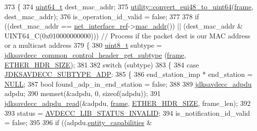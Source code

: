 \begin{DoxyCode}
373 \{
374     \hyperlink{parse_8c_aec6fcb673ff035718c238c8c9d544c47}{uint64\_t} dest\_mac\_addr;
375     \hyperlink{namespaceavdecc__lib_1_1utility_a93805682670fa173878eaecac28efc2c}{utility::convert\_eui48\_to\_uint64}(\hyperlink{gst__avb__playbin_8c_ac8e710e0b5e994c0545d75d69868c6f0}{frame}, dest\_mac\_addr);
376     is\_operation\_id\_valid = \textcolor{keyword}{false};
377 
378     \textcolor{keywordflow}{if} ((dest\_mac\_addr == \hyperlink{namespaceavdecc__lib_adb4da03bc65b7846cc240ee919bbde19}{net\_interface\_ref}->\hyperlink{classavdecc__lib_1_1net__interface__imp_a742e975c065f9067f42182847df080da}{mac\_addr}()) || (dest\_mac\_addr & 
      UINT64\_C(0x010000000000))) \textcolor{comment}{// Process if the packet dest is our MAC address or a multicast address}
379     \{
380         \hyperlink{stdint_8h_aba7bc1797add20fe3efdf37ced1182c5}{uint8\_t} subtype = \hyperlink{group__jdksavdecc__avtp__common__control__header_ga42ef04eef2565c32449a0593033de47b}{jdksavdecc\_common\_control\_header\_get\_subtype}
      (\hyperlink{gst__avb__playbin_8c_ac8e710e0b5e994c0545d75d69868c6f0}{frame}, \hyperlink{namespaceavdecc__lib_a6c827b1a0d973e18119c5e3da518e65ca9512ad9b34302ba7048d88197e0a2dc0}{ETHER\_HDR\_SIZE});
381 
382         \textcolor{keywordflow}{switch} (subtype)
383         \{
384         \textcolor{keywordflow}{case} \hyperlink{group__subtype_gad332b6f1f3f41f705c04917256c26761}{JDKSAVDECC\_SUBTYPE\_ADP}:
385         \{
386             end\_station\_imp * end\_station = \hyperlink{openavb__types__base__pub_8h_a070d2ce7b6bb7e5c05602aa8c308d0c4}{NULL};
387             \textcolor{keywordtype}{bool} found\_adp\_in\_end\_station = \textcolor{keyword}{false};
388 
389             \hyperlink{structjdksavdecc__adpdu}{jdksavdecc\_adpdu} adpdu;
390             memset(&adpdu, 0, \textcolor{keyword}{sizeof}(adpdu));
391             \hyperlink{group__adpdu_ga0b7b4807db97c9d3deaeed3b8b11adc1}{jdksavdecc\_adpdu\_read}(&adpdu, \hyperlink{gst__avb__playbin_8c_ac8e710e0b5e994c0545d75d69868c6f0}{frame}, 
      \hyperlink{namespaceavdecc__lib_a6c827b1a0d973e18119c5e3da518e65ca9512ad9b34302ba7048d88197e0a2dc0}{ETHER\_HDR\_SIZE}, frame\_len);
392 
393             status = \hyperlink{namespaceavdecc__lib_affd436edb2cecd20cfd784a84f852b2ba8a4a3486ee32871689aae7049d91ac0c}{AVDECC\_LIB\_STATUS\_INVALID};
394             is\_notification\_id\_valid = \textcolor{keyword}{false};
395 
396             \textcolor{keywordflow}{if} ((adpdu.\hyperlink{structjdksavdecc__adpdu_ae3350328f131c8382ba5030939a2a484}{entity\_capabilities} & 

\end{DoxyCode}
